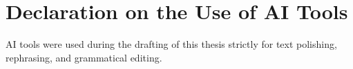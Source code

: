 \chapter*{Declaration on the Use of AI Tools}

AI tools were used during the drafting of this thesis strictly for text polishing, rephrasing, and grammatical editing.